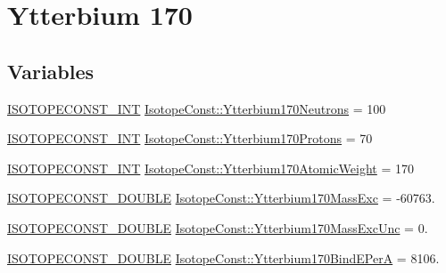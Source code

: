 \hypertarget{group___isotope_const-_ytterbium-_yb170}{}\section{Ytterbium 170}
\label{group___isotope_const-_ytterbium-_yb170}
\subsection*{Variables}
\begin{DoxyCompactItemize}
\item 
\mbox{\hyperlink{group___isotope_const-_macros_ga5f18360b3e99483a35c32d789e62621c}{I\+S\+O\+T\+O\+P\+E\+C\+O\+N\+S\+T\+\_\+\+I\+NT}} \mbox{\hyperlink{group___isotope_const-_ytterbium-_yb170_ga01381f0eed9696db8fe46e85b7ef54c8}{Isotope\+Const\+::\+Ytterbium170\+Neutrons}} = 100
\item 
\mbox{\hyperlink{group___isotope_const-_macros_ga5f18360b3e99483a35c32d789e62621c}{I\+S\+O\+T\+O\+P\+E\+C\+O\+N\+S\+T\+\_\+\+I\+NT}} \mbox{\hyperlink{group___isotope_const-_ytterbium-_yb170_ga81d65233327e255ef225dc999827e4f9}{Isotope\+Const\+::\+Ytterbium170\+Protons}} = 70
\item 
\mbox{\hyperlink{group___isotope_const-_macros_ga5f18360b3e99483a35c32d789e62621c}{I\+S\+O\+T\+O\+P\+E\+C\+O\+N\+S\+T\+\_\+\+I\+NT}} \mbox{\hyperlink{group___isotope_const-_ytterbium-_yb170_ga9feaf39bdd0b8164490d741aa9ca1968}{Isotope\+Const\+::\+Ytterbium170\+Atomic\+Weight}} = 170
\item 
\mbox{\hyperlink{group___isotope_const-_macros_ga8f45a7272ce02c0b4c65c44636ed719a}{I\+S\+O\+T\+O\+P\+E\+C\+O\+N\+S\+T\+\_\+\+D\+O\+U\+B\+LE}} \mbox{\hyperlink{group___isotope_const-_ytterbium-_yb170_gafeaa1752d6f5b9306ad490d41fa57647}{Isotope\+Const\+::\+Ytterbium170\+Mass\+Exc}} = -\/60763.
\item 
\mbox{\hyperlink{group___isotope_const-_macros_ga8f45a7272ce02c0b4c65c44636ed719a}{I\+S\+O\+T\+O\+P\+E\+C\+O\+N\+S\+T\+\_\+\+D\+O\+U\+B\+LE}} \mbox{\hyperlink{group___isotope_const-_ytterbium-_yb170_ga5445d5ba19fa8e196ff418bb73ec779f}{Isotope\+Const\+::\+Ytterbium170\+Mass\+Exc\+Unc}} = 0.
\item 
\mbox{\hyperlink{group___isotope_const-_macros_ga8f45a7272ce02c0b4c65c44636ed719a}{I\+S\+O\+T\+O\+P\+E\+C\+O\+N\+S\+T\+\_\+\+D\+O\+U\+B\+LE}} \mbox{\hyperlink{group___isotope_const-_ytterbium-_yb170_gadd649549b9128035a2d32fda8400544d}{Isotope\+Const\+::\+Ytterbium170\+Bind\+E\+PerA}} = 8106.
\item 

\end{DoxyCompactItemize}
